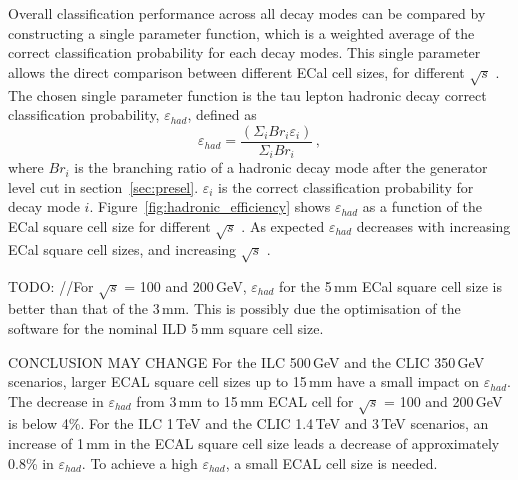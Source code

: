 \documentclass[a4paper,11pt]{article}
\newcommand{\rootS}{\ensuremath{\sqrt{s}} }
\begin{document}
Overall classification performance across all decay modes can be compared by constructing a single parameter function, which is a weighted average of the correct classification probability for each decay modes. This single parameter allows the direct comparison between different ECal cell sizes, for different \rootS. The chosen single parameter function is the tau lepton hadronic decay correct classification probability, $\varepsilon_{had}$, defined as
\begin{equation}
\label{eq:had}
\varepsilon_{had} = \frac{\left(\Sigma_{i} {Br}_{i}\varepsilon_{i}\right)}{\Sigma_{i} {Br}_{i}}  \,,
\end{equation}
where $Br_{i}$ is the branching ratio of a hadronic decay mode after the generator level cut in section~\ref{sec:presel}. $\varepsilon_{i}$ is the correct classification probability for decay mode $i$. Figure~\ref{fig:hadronic_efficiency} shows  $\varepsilon_{had}$ as a function of the ECal square cell size for different \rootS. As expected  $\varepsilon_{had}$ decreases with increasing ECal square cell sizes, and increasing \rootS.




TODO:
//For \rootS = 100 and 200\,GeV, $\varepsilon_{had}$ for the 5\,mm ECal square cell size is better than that of the 3\,mm. This is possibly due the optimisation of the software for the nominal ILD 5\,mm square cell size.


CONCLUSION MAY CHANGE
For the ILC 500\,GeV and the CLIC 350\,GeV  scenarios, larger ECAL square cell sizes up to 15\,mm have a small impact on $\varepsilon_{had}$. The decrease in $\varepsilon_{had}$  from 3\,mm to 15\,mm ECAL cell for \rootS = 100 and 200\,GeV is below 4\%.  For the ILC 1\,TeV and the CLIC 1.4\,TeV and 3\,TeV scenarios, an increase of 1\,mm in the ECAL square cell size leads a decrease of approximately 0.8\% in $\varepsilon_{had}$. To achieve a high $\varepsilon_{had}$, a small ECAL cell size is needed.



\end{document}
